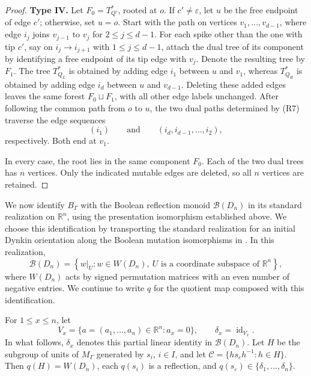 \documentclass[a4paper, 12pt, reqno]{amsart}
\theoremstyle{definition}
\begin{document}
\begin{proof}
%
\textbf{Type IV.}  Let $F_0=T_{Q'}^*$, rooted at $o$. If $c'\ne\varepsilon$, let $u$ be the free endpoint of edge $c'$; otherwise, set $u=o$. Start with the path on vertices $v_1,\ldots,v_{d-1}$, where edge $i_j$ joins $v_{j-1}$ to $v_j$ for $2\le j\le d-1$. For each spike other than the one with tip $c'$, say on $i_j\to i_{j+1}$ with $1\le j\le d-1$, attach the dual tree of its component by identifying a free endpoint of its tip edge with $v_j$. Denote the resulting tree by $F_1$. The tree $T_{Q_L}^*$ is obtained by adding edge $i_1$ between $u$ and $v_1$, whereas $T_{Q_R}^*$ is obtained by adding edge $i_d$ between $u$ and $v_{d-1}$. Deleting these added edges leaves the same forest $F_0\sqcup F_1$, with all other edge labels unchanged. After following the common path from $o$ to $u$, the two dual paths determined by {\rm(R7)} traverse the edge sequences
\[
(i_1) \qquad\text{and}\qquad  (i_d,i_{d-1},\ldots,i_2),
\]
respectively. Both end at $v_1$.


In every case, the root lies in the same component $F_0$. Each of the two dual trees has $n$ vertices. Only the indicated mutable edges are deleted, so all $n$ vertices are retained.
\end{proof}


We now identify $B_\Gamma$ with the Boolean reflection monoid $\mathcal B(D_n)$ in its standard realization on $\mathbb R^n$, using the presentation isomorphism established above. We choose this identification by transporting the standard realization for an initial Dynkin orientation along the Boolean mutation isomorphisms in \cite[Theorem 4.7 and Proposition 7.1]{DLL2020}. In this realization,
\[
\mathcal B(D_n)= \left\{ w|_U : w\in W(D_n),\  U\text{ is a coordinate subspace of }\mathbb R^n \right\},
\]
where $W(D_n)$ acts by signed permutation matrices with an even number of negative entries. We continue to write $q$ for the quotient map composed with this identification.

For $1\le x\le n$, let
\[
V_x=\{a=(a_1,\ldots,a_n)\in\mathbb R^n:a_x=0\}, \qquad \delta_x=\operatorname{id}_{V_x}.
\]
In what follows, $\delta_x$ denotes this partial linear identity in $\mathcal B(D_n)$. Let $H$ be the subgroup of units of $M_\Gamma$ generated by $s_i$, $i\in I$, and let $\mathcal C=\{hs_\varepsilon h^{-1}:h\in H\}.$  Then $q(H)=W(D_n)$, each $q(s_i)$ is a reflection, and $q(s_\varepsilon)\in\{\delta_1,\ldots,\delta_n\}.$
\end{document}
